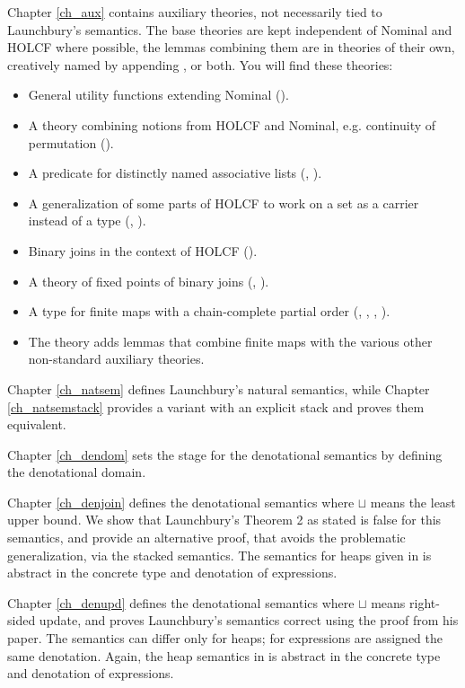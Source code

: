 \documentclass[11pt,a4paper,parskip=half]{scrartcl}
\begin{document}
Chapter \ref{ch_aux} contains auxiliary theories, not necessarily tied to Launchbury's semantics. The base theories are kept independent of Nominal and HOLCF where possible, the lemmas combining them are in theories of their own, creatively named by appending ,  or both.  You will find these theories:
\begin{itemize}
\item General utility functions extending Nominal ().
\item A theory combining notions from HOLCF and Nominal, e.g. continuity of permutation ().
\item A predicate for distinctly named associative lists (, ). 
\item A generalization of some parts of HOLCF to work on a set as a carrier instead of a type (, ).
\item Binary joins in the context of HOLCF ().
\item A theory of fixed points of binary joins (, ).
\item A type for finite maps with a chain-complete partial order (, , , ).
\item The theory  adds lemmas that combine finite maps with the various other non-standard auxiliary theories.
\end{itemize}

Chapter \ref{ch_natsem} defines Launchbury's natural semantics, while Chapter \ref{ch_natsemstack} provides a variant with an explicit stack and proves them equivalent.

Chapter \ref{ch_dendom} sets the stage for the denotational semantics by defining the denotational domain.

Chapter \ref{ch_denjoin} defines the denotational semantics where $\sqcup$ means the least upper bound. We show that Launchbury's Theorem 2 as stated is false for this semantics, and provide an alternative proof, that avoids the problematic generalization, via the stacked semantics. The semantics for heaps given in  is abstract in the concrete type and denotation of expressions.

Chapter \ref{ch_denupd} defines the denotational semantics where $\sqcup$ means right-sided update, and proves Launchbury's semantics correct using the proof from his paper. The semantics can differ only for heaps; for expressions are assigned the same denotation. Again, the heap semantics in  is abstract in the concrete type and denotation of expressions.
\end{document}
